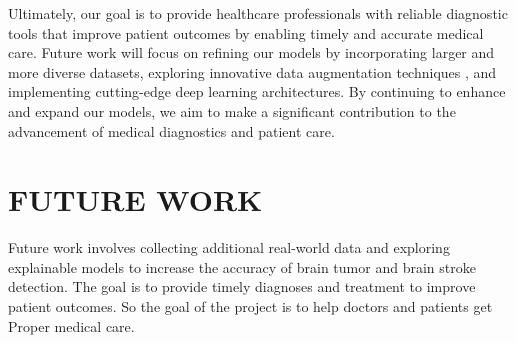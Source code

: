 \documentclass[conference]{IEEEtran}
\begin{document}
Ultimately, our goal is to provide healthcare professionals with reliable diagnostic tools that improve patient outcomes by enabling timely and accurate medical care. Future work will focus on refining our models by incorporating larger and more diverse datasets, exploring innovative data augmentation techniques \cite{huggingface_data}, and implementing cutting-edge deep learning architectures. By continuing to enhance and expand our models, we aim to make a significant contribution to the advancement of medical diagnostics and patient care.

\section{FUTURE WORK}

Future work involves collecting additional real-world data and exploring explainable models to increase the accuracy of brain tumor and brain stroke detection. 
The goal is to provide timely diagnoses and treatment to improve patient outcomes.
So the goal of the project is to help doctors and patients get Proper medical care.

 


\end{document}
